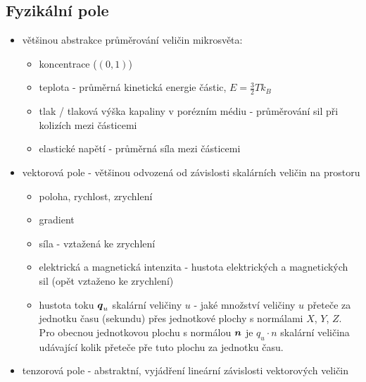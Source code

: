 \subsection{Fyzikální pole}
\begin{itemize}
 \item většinou abstrakce průměrování veličin mikrosvěta:
 \begin{itemize}
    \item koncentrace ($(0,1)$)
    \item teplota - průměrná kinetická energie částic, $ E = \frac{3}{2}T k_B$
    \item tlak / tlaková výška kapaliny v porézním médiu - průměrování sil při kolizích mezi částicemi
    \item elastické napětí - průměrná síla mezi částicemi
 \end{itemize}
 \item vektorová pole - většinou odvozená od závislosti skalárních veličin na prostoru
 \begin{itemize}
    \item poloha, rychlost, zrychlení
    \item gradient
    \item síla - vztažená ke zrychlení
    \item elektrická a magnetická intenzita - hustota elektrických a magnetických sil (opět vztaženo ke zrychlení)
    \item hustota toku $\mathbf{\boldsymbol{q}}_u$ skalární veličiny $u$ - jaké množství veličiny $u$ přeteče za 
    jednotku času (sekundu)
          přes jednotkové plochy s normálami $X$, $Y$, $Z$.\\
          Pro obecnou jednotkovou plochu s normálou $\mathbf{\boldsymbol{n}}$ je $q_u \cdot n$ skalární veličina 
          udávající kolik přeteče pře tuto plochu za jednotku času.          
 \end{itemize}

 \item tenzorová pole - abstraktní, vyjádření lineární závislosti vektorových veličin\\
 

\end{itemize}
